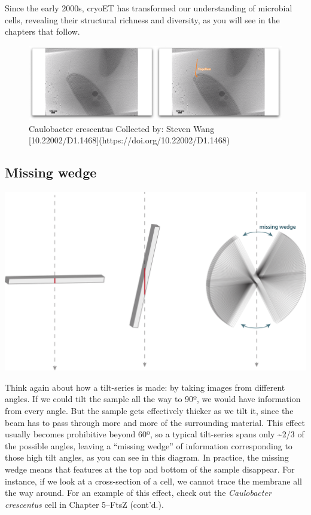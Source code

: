 \documentclass[]{tufte-book}
\begin{document}
Since the early 2000s, cryoET has transformed our understanding of
microbial cells, revealing their structural richness and diversity, as
you will see in the chapters that follow.

\begin{figure}
\includegraphics{movie_stills/1_6} \caption[Caulobacter crescentus Collected by]{Caulobacter crescentus Collected by: Steven Wang [10.22002/D1.1468](https://doi.org/10.22002/D1.1468)}\label{fig:unnamed-chunk-9}
\end{figure}

\subsection{Missing wedge}\label{Missing_wedge}

\includegraphics{img/schematics/1_6_1}

Think again about how a tilt-series is made: by taking images from
different angles. If we could tilt the sample all the way to 90º, we
would have information from every angle. But the sample gets effectively
thicker as we tilt it, since the beam has to pass through more and more
of the surrounding material. This effect usually becomes prohibitive
beyond 60º, so a typical tilt-series spans only \textasciitilde{}2/3 of
the possible angles, leaving a ``missing wedge'' of information
corresponding to those high tilt angles, as you can see in this diagram.
In practice, the missing wedge means that features at the top and bottom
of the sample disappear. For instance, if we look at a cross-section of
a cell, we cannot trace the membrane all the way around. For an example
of this effect, check out the \emph{Caulobacter crescentus} cell in
Chapter 5--FtsZ (cont'd.).
\end{document}
